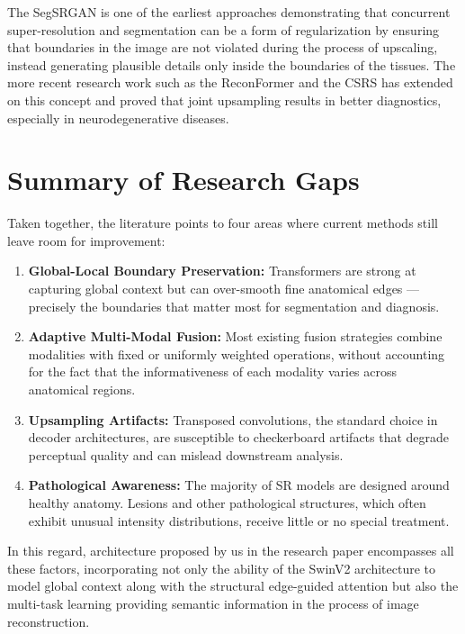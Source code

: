 The SegSRGAN is one of the earliest approaches demonstrating that concurrent super-resolution and segmentation can be a form of regularization by ensuring that boundaries in the image are not violated during the process of upscaling, instead generating plausible details only inside the boundaries of the tissues. The more recent research work such as the ReconFormer and the CSRS has extended on this concept and proved that joint upsampling results in better diagnostics, especially in neurodegenerative diseases.

\section{Summary of Research Gaps}
Taken together, the literature points to four areas where current methods still leave room for improvement:

\begin{enumerate}
    \item \textbf{Global-Local Boundary Preservation:} Transformers are strong at capturing global context but can over-smooth fine anatomical edges — precisely the boundaries that matter most for segmentation and diagnosis.
    \item \textbf{Adaptive Multi-Modal Fusion:} Most existing fusion strategies combine modalities with fixed or uniformly weighted operations, without accounting for the fact that the informativeness of each modality varies across anatomical regions.
    \item \textbf{Upsampling Artifacts:} Transposed convolutions, the standard choice in decoder architectures, are susceptible to checkerboard artifacts that degrade perceptual quality and can mislead downstream analysis.
    \item \textbf{Pathological Awareness:} The majority of SR models are designed around healthy anatomy. Lesions and other pathological structures, which often exhibit unusual intensity distributions, receive little or no special treatment.
\end{enumerate}

In this regard, architecture proposed by us in the research paper encompasses all these factors, incorporating not only the ability of the SwinV2 architecture to model global context along with the structural edge-guided attention but also the multi-task learning providing semantic information in the process of image reconstruction.